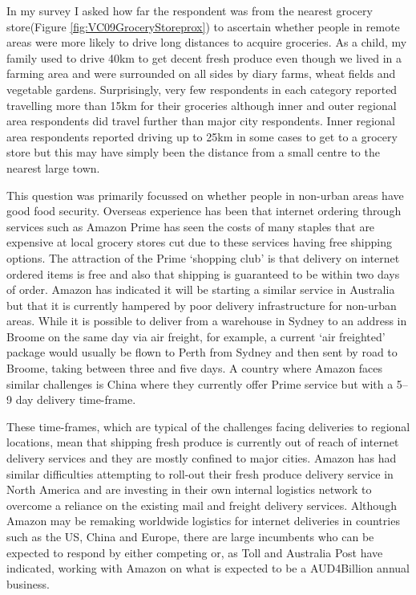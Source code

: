 In my survey I asked how far the respondent was from the nearest grocery store(Figure \ref{fig:VC09GroceryStoreprox}) to ascertain whether people in remote areas were more likely to drive long distances to acquire groceries. As a child, my family used to drive 40km to get decent fresh produce even though we lived in a farming area and were surrounded on all sides by diary farms, wheat fields and vegetable gardens. Surprisingly, very few respondents in each category reported travelling more than 15km for their groceries although inner and outer regional area respondents did travel further than major city respondents. Inner regional area respondents reported driving up to 25km in some cases to get to a grocery store but this may have simply been the distance from a small centre to the nearest large town. 


This question was primarily focussed on whether people in non-urban areas have good food security. Overseas experience has been that internet ordering through services such as Amazon Prime has seen the costs of many staples that are expensive at local grocery stores cut due to these services having free shipping options. The attraction of the Prime `shopping club' is that delivery on internet ordered items is free and also that shipping is guaranteed to be within two days of order. Amazon has indicated it will be starting a similar service in Australia but that it is currently hampered by poor delivery infrastructure for non-urban areas. While it is possible to deliver from a warehouse in Sydney to an address in Broome on the same day via air freight, for example, a current `air freighted' package would usually be flown to Perth from Sydney and then sent by road to Broome, taking between three and five days. A country where Amazon faces similar challenges is China where they currently offer Prime service but with a 5--9 day delivery time-frame.\cite{RefWorks:398}

These time-frames, which are typical of the challenges facing deliveries to regional locations, mean that shipping fresh produce is currently out of reach of internet delivery services and they are mostly confined to major cities. Amazon has had similar difficulties attempting to roll-out their fresh produce delivery service in North America and are investing in their own internal logistics network to overcome a reliance on the existing mail and freight delivery services.\cite{RefWorks:399} Although Amazon may be remaking worldwide logistics for internet deliveries in countries such as the US, China and Europe, there are large incumbents who can be expected to respond by either competing or, as Toll and Australia Post have indicated, working with Amazon on what is expected to be a AUD4Billion annual business\cite{RefWorks:400}.

